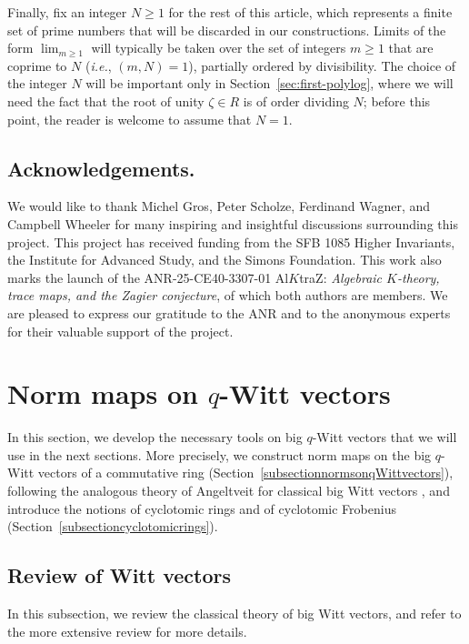 \documentclass[10pt,twoside]{scrarticle}
\newlength{\mar} \setlength{\mar}{1cm}%
\newlength{\len}
\theoremstyle{definition}
\renewcommand{\ge}{\geqslant}
\numberwithin{equation}{theorem}
\begin{document}
Finally, fix an integer $N \ge 1$ for the rest of this article, which represents a finite set of prime numbers that will be discarded in our constructions. Limits of the form $\lim_{m \ge 1}$ will typically be taken over the set of integers $m \ge 1$ that are coprime to $N$ (\emph{i.e.}, $(m,N)=1$), partially ordered by divisibility. The choice of the integer $N$ will be important only in Section~\ref{sec:first-polylog}, where we will need the fact that the root of unity $\zeta \in R$ is of order dividing $N$; 
before this point, the reader is welcome to assume that $N=1$.

\subsection*{Acknowledgements.}

We would like to thank Michel Gros, Peter Scholze, Ferdinand Wagner, and Campbell Wheeler for many inspiring and insightful discussions surrounding this project.
This project has received funding from the SFB 1085 Higher Invariants, the Institute for Advanced Study, and the Simons Foundation. This work also marks the launch of the ANR-25-CE40-3307-01 Al$K$traZ: \emph{Algebraic $K$\nobreakdash-theory, trace maps, and the Zagier conjecture}, of which both authors are members. We are pleased to express our gratitude to the ANR and to the anonymous experts for their valuable support of the project.


\section{Norm maps on $q$-Witt vectors}

In this section, we develop the necessary tools on big $q$-Witt vectors that we will use in the next sections. More precisely, we construct norm maps on the big $q$-Witt vectors of a commutative ring (Section~\ref{subsectionnormsonqWittvectors}), following the analogous theory of Angeltveit for classical big Witt vectors \cite{angeltveit_norm}, and introduce the notions of cyclotomic rings and of cyclotomic Frobenius (Section~\ref{subsectioncyclotomicrings}).


\subsection{Review of Witt vectors}\label{sectionreviewbigWittvectors}

In this subsection, we review the classical theory of big Witt vectors, and refer to the more extensive review \cite[Section~1]{hesselholt_deRham-Witt} for more details.
\end{document}

